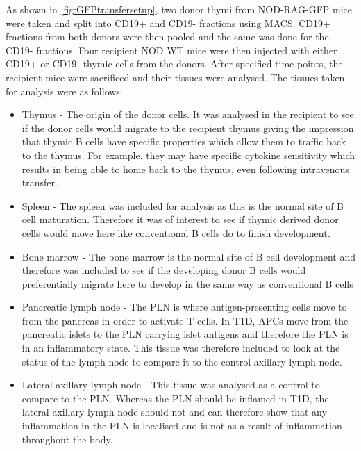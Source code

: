 As shown in \cref{fig:GFPtransfersetup}, two donor thymi from NOD-RAG-GFP mice were taken and split into CD19+ and CD19- fractions using MACS.
CD19+ fractions from both donors were then pooled and the same was done for the CD19- fractions.
Four recipient NOD WT mice were then injected with either CD19+ or CD19- thymic cells from the donors.
After specified time points, the recipient mice were sacrificed and their tissues were analysed.
The tissues taken for analysis were as follows:
\begin{itemize}
\item Thymus - The origin of the donor cells. It was analysed in the recipient to see if the donor cells would migrate to the recipient thymus giving the impression that thymic B cells have specific properties which allow them to traffic back to the thymus.
For example, they may have specific cytokine sensitivity which results in being able to home back to the thymus, even following intravenous transfer.
\item Spleen - The spleen was included for analysis as this is the normal site of B cell maturation.
Therefore it was of interest to see if thymic derived donor cells would move here like conventional B cells do to finish development.
\item Bone marrow - The bone marrow is the normal site of B cell development and therefore was included to see if the developing donor B cells would preferentially migrate here to develop in the same way as conventional B cells
\item Pancreatic lymph node - The PLN is where antigen-presenting cells move to from the pancreas in order to activate T cells.
In T1D, APCs move from the pancreatic islets to the PLN carrying islet antigens and therefore the PLN is in an inflammatory state.
This tissue was therefore included to look at the status of the lymph node to compare it to the control axillary lymph node.
\item Lateral axillary lymph node - This tissue was analysed as a control to compare to the PLN.
Whereas the PLN should be inflamed in T1D, the lateral axillary lymph node should not and can therefore show that any inflammation in the PLN is localised and is not as a result of inflammation throughout the body.
\end{itemize}

